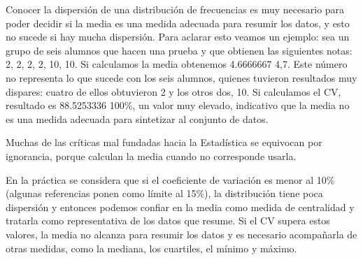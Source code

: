 \documentclass[]{book}
\begin{document}
Conocer la dispersión de una distribución de frecuencias es muy
necesario para poder decidir si la media es una medida adecuada para
resumir los datos, y esto no sucede si hay mucha dispersión. Para
aclarar esto veamos un ejemplo: sea un grupo de seis alumnos que hacen una prueba y que obtienen las siguientes notas: 2, 2, 2, 2, 10, 10. Si calculamos la media obtenemos 4.6666667 4,7. Este número no representa lo que sucede con los seis alumnos, quienes tuvieron resultados muy dispares: cuatro de ellos obtuvieron 2 y los otros dos, 10. Si calculamos el CV, resultado es 88.5253336 100\%, un valor muy elevado, indicativo que la media no es una medida adecuada para sintetizar al conjunto de datos.

Muchas de las críticas mal fundadas hacia la Estadística se equivocan por ignorancia, porque calculan la media cuando no corresponde usarla.

En la práctica se considera que si el coeficiente de variación es menor al 10\% (algunas referencias ponen como límite al 15\%), la distribución tiene poca dispersión y entonces podemos confiar en la media como medida de centralidad y tratarla como representativa de los datos que resume. Si el CV supera estos valores, la media no alcanza para resumir los datos y es necesario acompañarla de otras medidas, como la mediana, los cuartiles, el mínimo y máximo.
\end{document}
